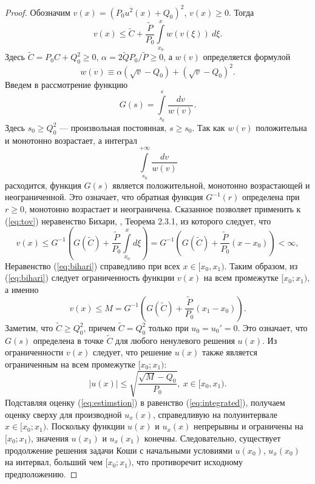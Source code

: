 \begin{proof}
%
Обозначим $v(x) = (P_0 u^2(x) + Q_0)^2$, $v(x) \ge 0$.
Тогда
%
\begin{equation}
v(x) \le \widetilde{C} +  \dfrac{\widetilde{P}}{P_0}\int \limits_{x_0}^x w(v(\xi))~d\xi. \label{eq:tov}
\end{equation}
%
Здесь $\widetilde{C} = P_0 C + Q_0^2 \ge 0$, $\alpha = {2\widetilde{Q} P_0}/{\widetilde{P}} \ge 0$, а $w(v)$ определяется формулой
%
\begin{equation}
w(v)\equiv\alpha (\sqrt{v} - Q_0) + (\sqrt{v} - Q_0)^2.
\label{eq:defw}
\end{equation}
%
Введем в рассмотрение функцию
%
\begin{equation}
G(s) = \int \limits_{s_0}^s \dfrac{dv}{w(v)}.
\label{eq:G}
\end{equation}
%
Здесь $s_0 \ge Q_0^2$ --- произвольная постоянная, $s \ge s_0$.
Так как $w(v)$ положительна и монотонно возрастает, а интеграл
%
\begin{equation}
\int \limits_{s_0}^{+\infty} \dfrac{dv}{w(v)}
\end{equation}
%
расходится, функция $G(s)$ является положительной, монотонно возрастающей и неограниченной.
Это означает, что обратная функция $G^{-1}(r)$ определена при $r \ge 0$, монотонно возрастает и неограничена.
Сказанное позволяет применить к (\ref{eq:tov}) неравенство Бихари, \cite{Pachpatte}, Теорема 2.3.1, из которого следует, что
%
\begin{equation}
v(x) \le G^{-1} \left( G(\widetilde{C}) +  \dfrac{\widetilde{P}}{P_0} {\int \limits_{x_0}^{x} d\xi} \right) = G^{-1} \left( G(\widetilde{C}) + \dfrac{\widetilde{P}}{P_0}(x - x_0) \right) < \infty,
\label{eq:bihari}
\end{equation}
%
Неравенство (\ref{eq:bihari}) справедливо при всех $x \in [x_0, x_1)$.
Таким образом, из (\ref{eq:bihari}) следует ограниченность функции $v(x)$ на всем промежутке $[x_0; x_1)$, а именно
%
\begin{equation}
v(x) \le M = G^{-1} \left( G(\widetilde{C}) + \dfrac{\widetilde{P}}{P_0}(x_1 - x_0) \right).
\end{equation}
%
Заметим, что $\widetilde{C} \ge Q_0^2$, причем $\widetilde{C} = Q_0^2$ только при $u_0 = u_0' = 0$.
Это означает, что $G(s)$ определена в точке $\widetilde{C}$ для любого ненулевого решения $u(x)$.
Из ограниченности $v(x)$ следует, что решение $u(x)$ также является ограниченным на всем промежутке $[x_0; x_1)$:
%
\begin{equation}
|u(x)| \le \sqrt{\dfrac{\sqrt{M} - Q_0}{P_0}},~x \in [x_0, x_1).
\label{eq:estimstion}
\end{equation}
%
Подставляя оценку (\ref{eq:estimstion}) в равенство (\ref{eq:integrated}), получаем оценку сверху для производной $u_x(x)$, справедливую на полуинтервале $x \in [x_0; x_1)$.
Поскольку функции $u(x)$ и $u_x(x)$ непрерывны и ограничены на $[x_0; x_1)$, значения $u(x_1)$ и $u_x(x_1)$ конечны.
Следовательно, существует продолжение решения задачи Коши с начальными условиями $u(x_0)$, $u_x(x_0)$ на интервал, больший чем $[x_0; x_1)$, что противоречит исходному предположению.


\end{proof}
